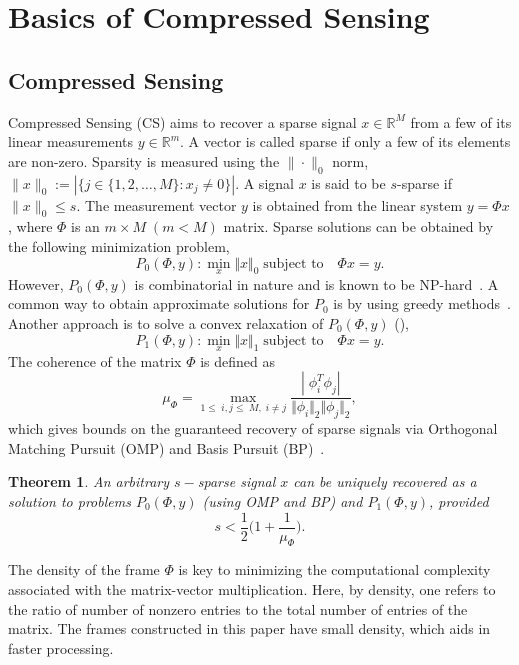 \documentclass{IEEEtran}
\newtheorem{theorem}{Theorem}[section]
\begin{document}
\section{Basics of Compressed Sensing}
\label{sec:basic}
\subsection{Compressed Sensing}
Compressed Sensing (CS) aims to recover a sparse signal $x\in \mathbb{R}^{M} $
from a few of its
linear measurements $y\in \mathbb{R}^{m} $. A vector is called sparse if only
a few of its elements
are non-zero. Sparsity is measured using the $\| \cdot \|_{0}$ norm,
$\|x\|_{0}:=|\{j\in\{1,2,\dots,M\}:x_{j}\neq 0\}|$. A signal $x$ is said to be
$s$-sparse if $\|x\|_0 \leq s$. 
The measurement vector $y$
is obtained from
the linear system $y=\Phi x$, where $\Phi$ is an $m \times M \;(m < M)$ matrix.
Sparse
solutions can be obtained by the following minimization problem,
\begin{displaymath}
P_0(\Phi,y):\min_{x} \Vert{x} \Vert_0 \; \mbox{subject to} \quad \Phi x=y.
\end{displaymath} 
However, $P_0(\Phi,y)$ is combinatorial in nature and is known to be
NP-hard~\cite{bourgain_2011}.
A common way to obtain approximate solutions for $P_0$ is by using greedy
methods~\cite{tropp_2004}.
Another approach is to solve a convex relaxation of
$P_{0}(\Phi,y)$ (\cite{can_2008}),
\begin{displaymath}
P_1(\Phi,y):\min_{x} \Vert{x} \Vert_1 \; \mbox{subject to} \quad \Phi x=y.
\end{displaymath}
\noindent The coherence of the matrix $\Phi$ is defined as
$$\mu_\Phi= \max_{1\leq\; i,j \leq\; M,\; i\neq j}
\frac{|\; \phi_i ^T\phi_j|}{\Vert \phi_i\Vert_{2} \Vert
  \phi_j \Vert_2},$$  
which gives bounds on the guaranteed
recovery of sparse signals via
Orthogonal Matching Pursuit (OMP) and Basis Pursuit (BP)~\cite{tropp_2004}. 
   
\noindent
\begin{theorem}\cite{elad_2010}
  An arbitrary $s-$sparse signal $x$ can be uniquely recovered
  as a solution to problems $P_{0}(\Phi,y)$ (using OMP and BP) and
  $P_{1}(\Phi,y)$,
  provided 
  \begin{equation} \label{eq:OMP_bound}
s < \frac{1}{2}\biggl(1+\frac{1}{\mu_\Phi}\biggl).
\end{equation}
\end{theorem}

The density of the frame $\Phi$ is key to minimizing the computational
complexity associated with the matrix-vector multiplication. Here,
by density, one refers to the ratio of number of nonzero entries to the total
number of entries of the matrix. The frames constructed in this paper have
small density, which aids in faster processing.
\end{document}
